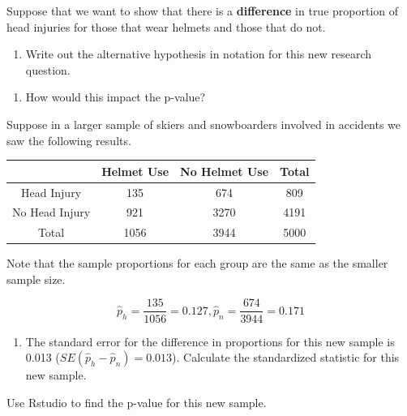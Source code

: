 \documentclass[
]{report}
\providecommand{\tightlist}{%
  \setlength{\itemsep}{0pt}\setlength{\parskip}{0pt}}
\begin{document}
Suppose that we want to show that there is a \textbf{difference} in true proportion of head injuries for those that wear helmets and those that do not.

\begin{enumerate}
\def\labelenumi{\arabic{enumi}.}
\setcounter{enumi}{12}
\tightlist
\item
  Write out the alternative hypothesis in notation for this new research question.
\end{enumerate}

\vspace{0.3in}

\begin{enumerate}
\def\labelenumi{\arabic{enumi}.}
\setcounter{enumi}{13}
\tightlist
\item
  How would this impact the p-value?
\end{enumerate}

\vspace{0.2in}

Suppose in a larger sample of skiers and snowboarders involved in accidents we saw the following results.

\begin{longtable}[]{@{}cccc@{}}
\toprule\noalign{}
& Helmet Use & No Helmet Use & Total \\
\midrule\noalign{}
\endhead
\bottomrule\noalign{}
\endlastfoot
Head Injury & 135 & 674 & 809 \\
No Head Injury & 921 & 3270 & 4191 \\
Total & 1056 & 3944 & 5000 \\
\end{longtable}

Note that the sample proportions for each group are the same as the smaller sample size.

\[\hat{p}_h = \frac{135}{1056}=0.127, \hat{p}_n = \frac{674}{3944}=0.171\]

\begin{enumerate}
\def\labelenumi{\arabic{enumi}.}
\setcounter{enumi}{14}
\tightlist
\item
  The standard error for the difference in proportions for this new sample is 0.013 (\(SE(\hat{p}_h - \hat{p}_n) = 0.013\)). Calculate the standardized statistic for this new sample.
\end{enumerate}

\vspace{0.8in}

Use Rstudio to find the p-value for this new sample.
\end{document}
